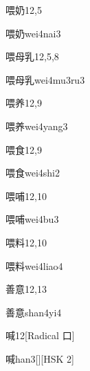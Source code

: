 \begin{entry}{喂奶}{12,5}
  \begin{phonetics}{喂奶}{wei4nai3}
  \end{phonetics}
\end{entry}

\begin{entry}{喂母乳}{12,5,8}
  \begin{phonetics}{喂母乳}{wei4mu3ru3}
  \end{phonetics}
\end{entry}

\begin{entry}{喂养}{12,9}
  \begin{phonetics}{喂养}{wei4yang3}
  \end{phonetics}
\end{entry}

\begin{entry}{喂食}{12,9}
  \begin{phonetics}{喂食}{wei4shi2}
  \end{phonetics}
\end{entry}

\begin{entry}{喂哺}{12,10}
  \begin{phonetics}{喂哺}{wei4bu3}
  \end{phonetics}
\end{entry}

\begin{entry}{喂料}{12,10}
  \begin{phonetics}{喂料}{wei4liao4}
  \end{phonetics}
\end{entry}

\begin{entry}{善意}{12,13}
  \begin{phonetics}{善意}{shan4yi4}
  \end{phonetics}
\end{entry}

\begin{entry}{喊}{12}[Radical 口]
  \begin{phonetics}{喊}{han3}[][HSK 2]
  \end{phonetics}
\end{entry}

